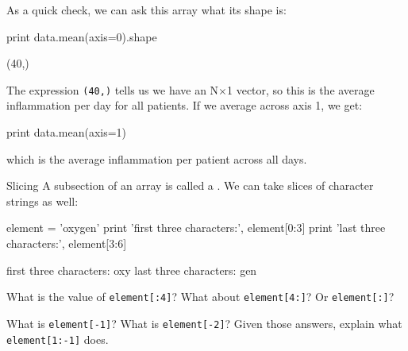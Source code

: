 As a quick check, we can ask this array what its shape is:

\begin{VerbIn}
print data.mean(axis=0).shape
\end{VerbIn}

\begin{VerbOut}
(40,)
\end{VerbOut}

The expression \texttt{(40,)} tells us we have an N${\times}$1 vector, so this is
the average inflammation per day for all patients. If we average across
axis 1, we get:

\begin{VerbIn}
print data.mean(axis=1)
\end{VerbIn}

\begin{VerbOut}
[ 5.45   5.425  6.1    5.9    5.55   6.225  5.975  6.65   6.625  6.525
  6.775  5.8    6.225  5.75   5.225  6.3    6.55   5.7    5.85   6.55
  5.775  5.825  6.175  6.1    5.8    6.425  6.05   6.025  6.175  6.55
  6.175  6.35   6.725  6.125  7.075  5.725  5.925  6.15   6.075  5.75
  5.975  5.725  6.3    5.9    6.75   5.925  7.225  6.15   5.95   6.275  5.7
  6.1    6.825  5.975  6.725  5.7    6.25   6.4    7.05   5.9  ]
\end{VerbOut}

which is the average inflammation per patient across all days.

\begin{swcbox}{Slicing}
A subsection of an array is called a . We can
take slices of character strings as well:

\begin{VerbIn}
element = 'oxygen'
print 'first three characters:', element[0:3]
print 'last three characters:', element[3:6]
\end{VerbIn}

\begin{VerbOut}
first three characters: oxy
last three characters: gen
\end{VerbOut}
\end{swcbox}

\begin{challenge}
  What is the value of \texttt{element{[}:4{]}}? What about
  \texttt{element{[}4:{]}}? Or \texttt{element{[}:{]}}?
\end{challenge}

\begin{challenge}
  What is \texttt{element{[}-1{]}}? What is \texttt{element{[}-2{]}}?
  Given those answers, explain what \texttt{element{[}1:-1{]}} does.
\end{challenge}

